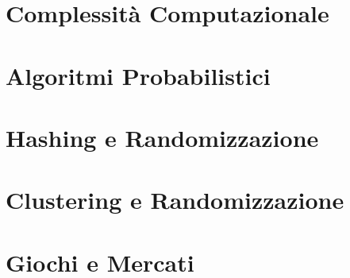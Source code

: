 \documentclass[11pt]{article}
\begin{document}
	\maketitle
	\tableofcontents
	\newpage	
	
	\section{Complessità Computazionale}
	
	\newpage
	
	\section{Algoritmi Probabilistici}
	
	\newpage
	
	\section{Hashing e Randomizzazione}
	
	\newpage
	
	\section{Clustering e Randomizzazione}
	
	\newpage
	
	\section{Giochi e Mercati}
	
	
	
	
\end{document}
